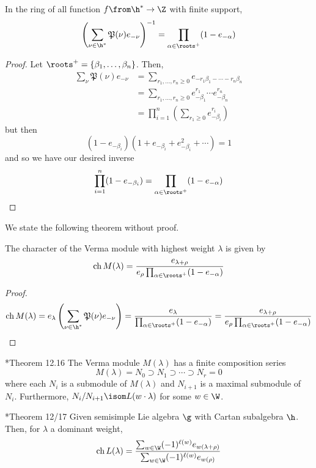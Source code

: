 \documentclass[11pt,leqno,oneside]{amsart}
\numberwithin{thm}{section}
\newcommand{\ch}{\operatorname{ch}}
\newcommand{\halfsum}{\rho}
\newcommand{\numposrootcombos}{\mathfrak{P}}
\begin{document}
\begin{lem}
  In the ring of all function \(f \from \h^* \to \Z\) with finite
  support, \[
    \left( \sum_{\nu \in \h^*} \numposrootcombos(\nu)e_{-\nu}
    \right)^{-1} = \prod_{\alpha \in \roots^+} (1-e_{-\alpha})
  \]
\end{lem}
\begin{proof}
  Let \(\roots^+ = \{\beta_1, \ldots, \beta_n\}\). Then,
  \begin{align*}
    \sum_{\nu} \numposrootcombos(\nu) e_{-\nu}
    & = \sum_{r_1,\ldots,r_n \geq 0}
      e_{-r_1\beta_1-\cdots-r_n\beta_n}\\
    & = \sum_{r_1,\ldots,r_n \geq 0} e^{r_1}_{-\beta_1} \cdots
      e^{r_n}_{-\beta_n} \\
    & = \prod_{i=1}^n \left( \sum_{r_1 \geq 0} e^{r_i}_{-\beta_i} \right)
  \end{align*}
  but then \[
    (1-e_{-\beta_i})(1+e_{-\beta_i}+e_{-\beta_i}^2+\cdots) = 1
  \]
  and so we have our desired inverse \[
    \prod_{i=1}^n (1-e_{-\beta_i}) = \prod_{\alpha \in
      \roots^+}(1-e_{-\alpha}) 
  \]
\end{proof}
We state the following theorem without proof.
\begin{thm}
  The character of the Verma module with highest weight \(\lambda\)
  is given by \[
    \ch M(\lambda) = \frac{e_{\lambda+\halfsum}}{e_{\halfsum}
      \prod_{\alpha \in \roots^+}(1-e_{-\alpha})}
  \]
\end{thm}
\begin{proof}
  \[
    \ch M(\lambda) = e_{\lambda} \left(\sum_{\nu \in \h^*}
      \numposrootcombos(\nu)e_{-\nu} \right) =
    \frac{e_{\lambda}}{\prod_{\alpha \in \roots^+}(1-e_{-\alpha})} =
    \frac{e_{\lambda+\halfsum}}{e_{\halfsum} \prod_{\alpha \in
        \roots^+}(1-e_{-\alpha})} 
  \]
\end{proof}
\begin{thm}
  \cite{carter}*{Theorem 12.16} The Verma module \(M(\lambda)\) has a
  finite composition series \[ 
    M(\lambda) = N_0 \supset N_1 \supset \cdots \supset N_r = 0
  \]
  where each \(N_i\) is a submodule of \(M(\lambda)\) and \(N_{i+1}\)
  is a maximal submodule of \(N_i\). Furthermore, \(N_i/N_{i+1} \isom
  L(w \cdot \lambda)\) for some \(w \in \W\). 
\end{thm}
\begin{thm}
  \cite{carter}*{Theorem 12/17} Given semisimple Lie algebra \(\g\)
  with Cartan subalgebra 
  \(\h\). Then, for \(\lambda\) a dominant weight, \[
    \ch L(\lambda) = \frac{\sum_{w \in \W} (-1)^{\ell(w)}
      e_{w(\lambda+\halfsum)}}{\sum_{w \in \W}
      (-1)^{\ell(w)}e_{w(\halfsum)}}
  \]
\end{thm}
\end{document}
